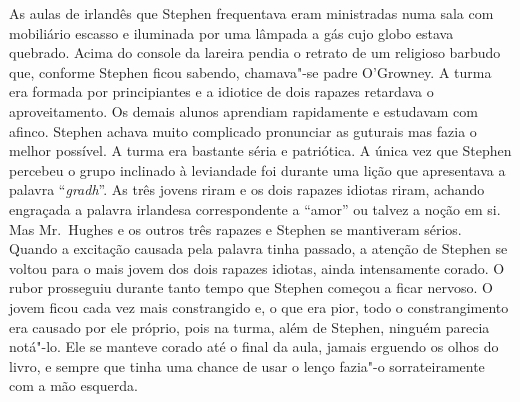 As aulas de irlandês que Stephen frequentava eram ministradas numa
sala com mobiliário escasso e iluminada por uma lâmpada a gás cujo
globo estava quebrado.  Acima do console da lareira pendia o retrato de
um religioso barbudo que, conforme Stephen ficou sabendo, chamava"-se
padre O’Growney.  A turma era formada por principiantes e a idiotice de
dois rapazes retardava o aproveitamento.  Os demais alunos aprendiam
rapidamente e estudavam com afinco.  Stephen achava muito
complicado pronunciar as guturais mas fazia o melhor possível.  A turma
era bastante séria e patriótica.  A única vez que Stephen percebeu o
grupo inclinado à leviandade foi durante uma lição que apresentava a
palavra “\textit{gradh}”.  As três jovens riram e os dois rapazes
idiotas riram, achando engraçada a palavra irlandesa correspondente a
“amor” ou talvez a noção em si.  Mas Mr.~Hughes e os outros três
rapazes e Stephen se mantiveram sérios.  Quando a excitação causada
pela palavra tinha passado, a atenção de Stephen se voltou para o mais
jovem dos dois rapazes idiotas, ainda intensamente corado.  O rubor
prosseguiu durante tanto tempo que Stephen começou a ficar nervoso.  \label{o"-jovem} O
jovem ficou cada vez mais constrangido e, o que era pior, todo o
constrangimento era causado por ele próprio, pois na turma, além de
Stephen, ninguém parecia notá"-lo.  Ele se manteve corado até o final
da aula, jamais erguendo os olhos do livro, e sempre que tinha uma
chance de usar o lenço fazia"-o sorrateiramente com a mão esquerda.

